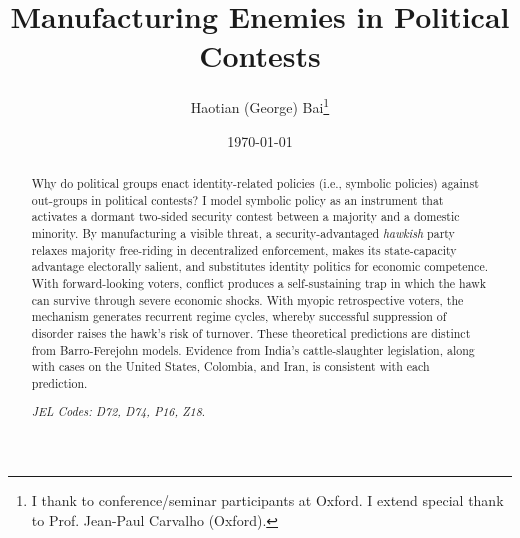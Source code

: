 \documentclass[11pt,twoside]{extarticle}
\title{Manufacturing Enemies in Political Contests}
\author{Haotian (George) Bai\thanks{I thank to conference/seminar participants at Oxford. I extend special thank to Prof. Jean-Paul Carvalho (Oxford).}}
\date{\today}
\begin{document}
\maketitle

\begin{abstract}
Why do political groups enact identity-related policies (i.e., symbolic policies) against out-groups in political contests? I model symbolic policy as an instrument that activates a dormant two-sided security contest between a majority and a domestic minority. By manufacturing a visible threat, a security-advantaged \emph{hawkish} party relaxes majority free-riding in decentralized enforcement, makes its state-capacity advantage electorally salient, and substitutes identity politics for economic competence. With forward-looking voters, conflict produces a self-sustaining trap in which the hawk can survive through severe economic shocks. With myopic retrospective voters, the mechanism generates recurrent regime cycles, whereby successful suppression of disorder raises the hawk's risk of turnover. These theoretical predictions are distinct from Barro-Ferejohn models. Evidence from India's cattle-slaughter legislation, along with cases on the United States, Colombia, and Iran, is consistent with each prediction. 

\emph{JEL Codes: D72, D74, P16, Z18}.


\end{abstract}
\clearpage
\end{document}
